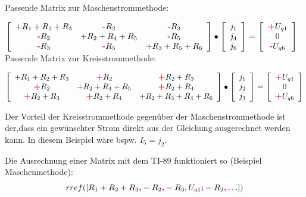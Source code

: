 Passende Matrix zur Maschenstrommethode:

$\left[\begin{array}{ccc}
	+R_1+R_2+R_3 &\text{\textbf{\textcolor{red}{-}}}R_2 &\text{\textbf{\textcolor{red}{-}}}R_3  \\
	\text{\textbf{\textcolor{red}{-}}}R_2 &+R_2+R_4+R_5
	&\text{\textbf{\textcolor{red}{-}}}R_5\\ 
	\text{\textbf{\textcolor{red}{-}}}R_3 &\text{\textbf{\textcolor{red}{-}}}R_5 &+R_3+R_5+R_6
	\end{array}\right] \bullet 
	\left[\begin{array}{l}j_1\\j_4\\j_6\end{array}\right] = 
	\left[\begin{array}{c}\text{\textbf{\textcolor{red}{+}}}U_{q1}\\0\\
	\text{\textbf{\textcolor{red}{-}}}U_{q6}
\end{array}\right]$\\

Passende Matrix zur Kreisstrommethode:

$\left[\begin{array}{ccc}
	+R_1+R_2+R_3 &\text{\textbf{\textcolor{red}{+}}}R_2 &\text{\textbf{\textcolor{red}{+}}}R_2+R_3\\
	\text{\textbf{\textcolor{red}{+}}}R_2 &+R_2+R_4+R_5
	&\text{\textbf{\textcolor{red}{+}}}R_2+R_4\\ 
	\text{\textbf{\textcolor{red}{+}}}R_2+R_3 &\text{\textbf{\textcolor{red}{+}}}R_2+R_4 &+R_2+R_3+R_4+R_6
	\end{array}\right] \bullet 
	\left[\begin{array}{l}j_1\\j_2\\j_3\end{array}\right] = 
	\left[\begin{array}{c}\text{\textbf{\textcolor{red}{+}}}U_{q1}\\0\\
	\text{\textbf{\textcolor{red}{+}}}U_{q6}
\end{array}\right]$

Der Vorteil der Kreisstrommethode gegenüber der Maschenstrommethode ist der,dass ein gewünschter Strom direkt aus der Gleichung ausgerechnet werden kann. In diesem Beispiel wäre bspw. $I_5 = j_2$.

Die Ausrechnung einer Matrix mit dem TI-89 funktioniert so (Beispiel  Maschenmethode):
$$rref([R_1+R_2+R_3\text{\textbf{\textcolor{red}{,}}}-R_2\text{\textbf{\textcolor{red}{,}}}-R_3,U_{q1}\text{\textbf{\textcolor{red}{;}}}
-R_2\text{\textbf{\textcolor{red}{,}}} \ldots])$$

